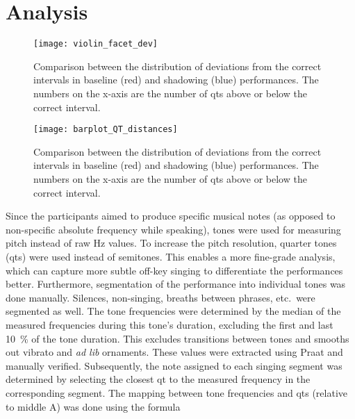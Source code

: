 
\section{Analysis}
\label{sec:analysis}

\begin{figure}[t]
	\centering
	\texttt{[image: violin\_facet\_dev]}
	\caption[Summary of within-participant interval deviation distribution]
		{Comparison between the distribution of deviations from the correct intervals in baseline (red) and shadowing (blue) performances.
		The numbers on the x-axis are the number of \acp{qt} above or below the correct interval.}
	\label{fig:violin_facet_dev}
\end{figure}

\begin{figure}[t]
	\centering
	\texttt{[image: barplot\_QT\_distances]}
	\caption[Distribution of interval deviations]
	{Comparison between the distribution of deviations from the correct intervals in baseline (red) and shadowing (blue) performances.
		The numbers on the x-axis are the number of \acp{qt} above or below the correct interval.}
	\label{fig:barplot_QT_distances}
\end{figure}

Since the participants aimed to produce specific musical notes (as opposed to non-specific absolute frequency while speaking), tones were used for measuring pitch instead of raw \si{\hertz} values.
To increase the pitch resolution, quarter tones (\acp{qt}) were used instead of semitones.
This enables a more fine-grade analysis, which can capture more subtle off-key singing to differentiate the performances better.
Furthermore, segmentation of the performance into individual tones was done manually.
Silences, non-singing, breaths between phrases, etc.\ were segmented as well.
The tone frequencies were determined by the median of the measured frequencies during this tone's duration, excluding the first and last \SI{10}{\percent} of the tone duration.
This excludes transitions between tones and smooths out vibrato and \textit{ad lib} ornaments.
These values were extracted using Praat \citep{Boersma2001praat} and manually verified.
Subsequently, the note assigned to each singing segment was determined by selecting the closest \ac{qt} to the measured frequency in the corresponding segment.
The mapping between tone frequencies and \acp{qt} (relative to middle A) was done using the formula

